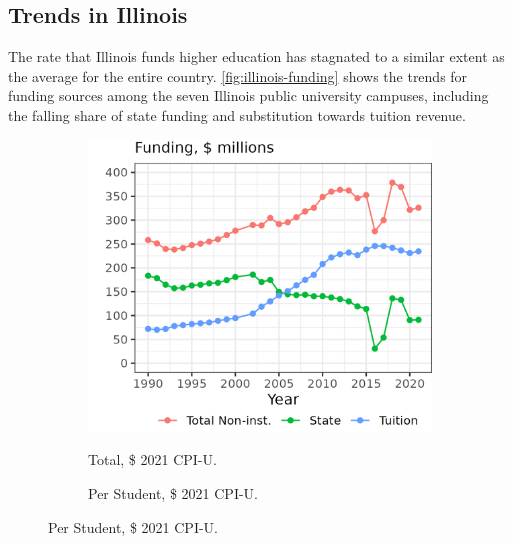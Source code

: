 \subsection{Trends in Illinois}
\label{sec:trends-illinois}

The rate that Illinois funds higher education has stagnated to a similar extent as the average for the entire country.
\autoref{fig:illinois-funding} shows the trends for funding sources among the seven Illinois public university campuses, including the falling share of state funding and substitution towards tuition revenue.

\begin{figure}[h!]
    \centering
    \singlespacing
    \caption{Mean Funding Sources among Illinois Public Universities, by Year.}
    \begin{subfigure}[b]{0.495\textwidth}
        \centering
        \caption{Total, \$ 2021 CPI-U.}
        \includegraphics[width=\textwidth]{figures/illinois-funding-total.png}
        \label{fig:illinois-funding-total}
    \end{subfigure}
    \begin{subfigure}[b]{0.495\textwidth}
        \centering
        \caption{Per Student, \$ 2021 CPI-U.}

\end{subfigure}
\end{figure}
